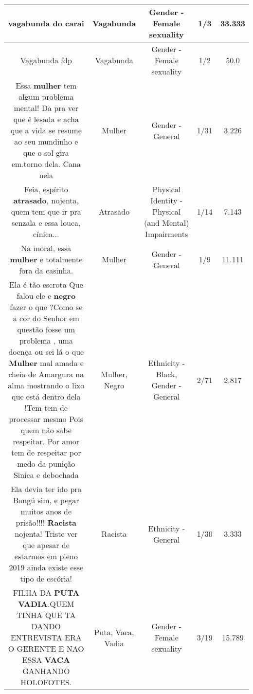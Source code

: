\documentclass[11pt]{article}
\newlength\mylength
\begin{document}
\begin{center}
\begin{longtable}{|C{.65\mylength}|C{.30\mylength}|C{.12\mylength}|C{.12\mylength}|C{.12\mylength}|}
  \small vagabunda do carai\normalsize   & Vagabunda & Gender - Female sexuality & 1/3 & 33.333 \\  \hline
  \small Vagabunda fdp\normalsize   & Vagabunda & Gender - Female sexuality & 1/2 & 50.0 \\  \hline
  \small Essa \textbf{mulher} tem algum problema mental! Da pra ver que é lesada e acha que a vida se resume ao seu mundinho e que o sol gira em.torno dela. Cana nela\normalsize   & Mulher & Gender - General & 1/31 & 3.226 \\  \hline
  \small Feia, espírito \textbf{atrasado}, nojenta, quem tem que ir pra senzala e essa louca, cínica...\normalsize   & Atrasado & Physical Identity - Physical (and Mental) Impairments & 1/14 & 7.143 \\  \hline
  \small Na moral, essa \textbf{mulher} e totalmente fora da casinha.\normalsize   & Mulher & Gender - General & 1/9 & 11.111 \\  \hline
  \small Ela é tão escrota Que falou ele e \textbf{negro} fazer o que ?Como se a cor do Senhor em questão fosse um problema , uma doença ou sei lá o que \textbf{Mulher} mal amada e cheia de Amargura na alma mostrando o lixo que está dentro dela !Tem tem de processar mesmo Pois quem não sabe respeitar. Por amor tem de respeitar por medo da punição Sinica e debochada\normalsize   & Mulher, Negro & Ethnicity - Black, Gender - General & 2/71 & 2.817 \\  \hline
  \small Ela devia ter ido pra Bangú sim, e pegar muitos anos de prisão!!!! \textbf{Racista} nojenta! Triste ver que apesar de estarmos em pleno 2019 ainda existe esse tipo de escória!\normalsize   & Racista & Ethnicity - General & 1/30 & 3.333 \\  \hline
  \small FILHA DA \textbf{PUTA} \textbf{VADIA}.QUEM TINHA QUE TA DANDO ENTREVISTA ERA O GERENTE E NAO ESSA \textbf{VACA} GANHANDO HOLOFOTES.\normalsize   & Puta, Vaca, Vadia & Gender - Female sexuality & 3/19 & 15.789 \\  \hline

\end{longtable}
\end{center}
\end{document}
